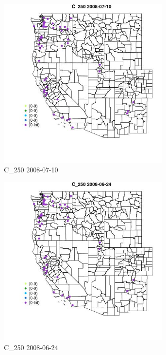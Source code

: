 \begin{figure} 
\centering  
\includegraphics[width=0.77\textwidth]{Code_Outputs/Report_ML_input_PM25_Step4_part_e_de_duplicated_aves_MapObsC_2502008-07-10.jpg} 
\caption{\label{fig:Report_ML_input_PM25_Step4_part_e_de_duplicated_avesMapObsC_2502008-07-10}C_250 2008-07-10} 
\end{figure} 
 

\begin{figure} 
\centering  
\includegraphics[width=0.77\textwidth]{Code_Outputs/Report_ML_input_PM25_Step4_part_e_de_duplicated_aves_MapObsC_2502008-06-24.jpg} 
\caption{\label{fig:Report_ML_input_PM25_Step4_part_e_de_duplicated_avesMapObsC_2502008-06-24}C_250 2008-06-24} 
\end{figure} 
 

